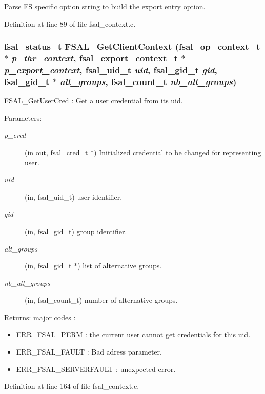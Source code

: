 Parse FS specific option string to build the export entry option. 

Definition at line 89 of file fsal\_\-context.c.
\subsubsection{\setlength{\rightskip}{0pt plus 5cm}fsal\_\-status\_\-t FSAL\_\-Get\-Client\-Context (fsal\_\-op\_\-context\_\-t $\ast$ {\em p\_\-thr\_\-context}, fsal\_\-export\_\-context\_\-t $\ast$ {\em p\_\-export\_\-context}, fsal\_\-uid\_\-t {\em uid}, fsal\_\-gid\_\-t {\em gid}, fsal\_\-gid\_\-t $\ast$ {\em alt\_\-groups}, fsal\_\-count\_\-t {\em nb\_\-alt\_\-groups})}\label{group__FSALCredFunctions_ga2}


FSAL\_\-Get\-User\-Cred : Get a user credential from its uid.

\begin{Desc}
\item[Parameters:]
\begin{description}
\item[{\em p\_\-cred}](in out, fsal\_\-cred\_\-t $\ast$) Initialized credential to be changed for representing user. \item[{\em uid}](in, fsal\_\-uid\_\-t) user identifier. \item[{\em gid}](in, fsal\_\-gid\_\-t) group identifier. \item[{\em alt\_\-groups}](in, fsal\_\-gid\_\-t $\ast$) list of alternative groups. \item[{\em nb\_\-alt\_\-groups}](in, fsal\_\-count\_\-t) number of alternative groups.\end{description}
\end{Desc}
\begin{Desc}
\item[Returns:]major codes :\begin{itemize}
\item ERR\_\-FSAL\_\-PERM : the current user cannot get credentials for this uid.\item ERR\_\-FSAL\_\-FAULT : Bad adress parameter.\item ERR\_\-FSAL\_\-SERVERFAULT : unexpected error. \end{itemize}
\end{Desc}


Definition at line 164 of file fsal\_\-context.c.